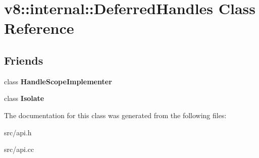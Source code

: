 \hypertarget{classv8_1_1internal_1_1_deferred_handles}{}\section{v8\+:\+:internal\+:\+:Deferred\+Handles Class Reference}
\label{classv8_1_1internal_1_1_deferred_handles}
\subsection*{Friends}
\begin{DoxyCompactItemize}
\item 
\hypertarget{classv8_1_1internal_1_1_deferred_handles_a4212b6d1addb496cb92d67a2e399a1f3}{}class {\bfseries Handle\+Scope\+Implementer}\label{classv8_1_1internal_1_1_deferred_handles_a4212b6d1addb496cb92d67a2e399a1f3}

\item 
\hypertarget{classv8_1_1internal_1_1_deferred_handles_aba4f0964bdacf2bbf62cf876e5d28d0a}{}class {\bfseries Isolate}\label{classv8_1_1internal_1_1_deferred_handles_aba4f0964bdacf2bbf62cf876e5d28d0a}

\end{DoxyCompactItemize}


The documentation for this class was generated from the following files\+:\begin{DoxyCompactItemize}
\item 
src/api.\+h\item 
src/api.\+cc\end{DoxyCompactItemize}
